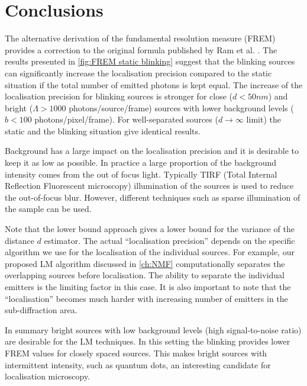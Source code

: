 
\clearpage
\section{Conclusions} 

The alternative derivation of the fundamental resolution measure (FREM) provides a correction to the original formula published by Ram et al. \cite{Ram2006}. The results presented in \autoref{fig:FREM static blinking} suggest that the blinking sources can significantly increase the localisation precision compared to the static situation if the total number of emitted photons is kept equal. The increase of the localisation precision for blinking sources is stronger for close ($d<50\unit{nm}$) and bright ($\Lambda>1000$ photons/source/frame) sources with lower background levels ($b<100$ photons/pixel/frame). For well-separated sources ($d\rightarrow\infty$ limit) the static and the blinking situation give identical results. 

Background has a large impact on the localisation precision and it is desirable to keep it as low as possible. In practice a large proportion of the background intensity comes from the out of focus light. Typically TIRF (Total Internal Reflection Fluorescent microscopy) illumination of the sources is used to reduce the out-of-focus blur. However, different techniques such as sparse illumination of the sample can be used. 

Note that the \CR lower bound approach gives a lower bound for the variance of the distance $d$ estimator. The actual ``localisation precision'' depends on the specific algorithm we use for the localisation of the individual sources. For example, our proposed LM algorithm discussed in \autoref{ch:NMF} computationally separates the overlapping sources before localisation. The ability to separate the individual emitters is the limiting factor in this case. It is also important to note that the ``localisation'' becomes much harder with increasing number of emitters in the sub-diffraction area.

In summary bright sources with low background levels (high signal-to-noise ratio) are desirable for the LM techniques. In this setting the blinking provides lower FREM values for closely spaced sources. This makes bright sources with intermittent intensity, such as quantum dots, an interesting candidate for localisation microscopy.


